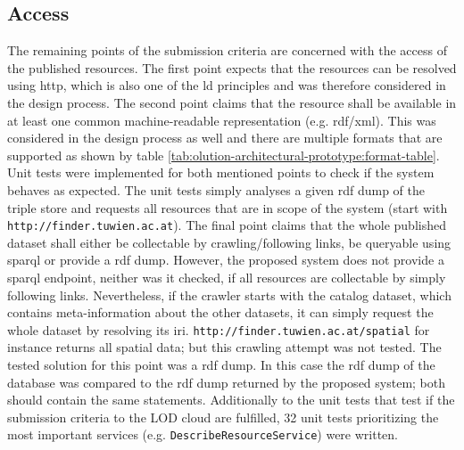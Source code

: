 \documentclass[draft,final]{vutinfth} %
\begin{document}
\subsection{Access}
\label{dicussion-chapter-evaluation:access}
The remaining points of the submission criteria are concerned with the access of the published resources. The first point expects that the resources can be resolved using \gls{http}, which is also one of the \gls{ld} principles and was therefore considered in the design process. The second point claims that the resource shall be available in at least one common machine-readable representation (e.g. \gls{rdf}/\gls{xml}). This was considered in the design process as well and there are multiple formats that are supported as shown by table \ref{tab:olution-architectural-prototype:format-table}. Unit 
tests were implemented for both mentioned points to check if the system behaves as expected. The unit tests simply analyses a given \gls{rdf} dump of the triple store and requests all resources that are in scope of the system (start with \texttt{http://finder.tuwien.ac.at}). The final point claims that the whole published dataset shall either be collectable by crawling/following links, be queryable using \gls{sparql} or provide a \gls{rdf} dump. However, the proposed system does not provide a \gls{sparql} endpoint, neither was it checked, if all resources are collectable by simply following links. Nevertheless, if the crawler starts with the catalog dataset, which contains meta-information about the other datasets, it can simply request the whole dataset by resolving its \gls{iri}. \texttt{http://finder.tuwien.ac.at/spatial} for instance returns all spatial data; but this crawling attempt was not tested. The tested solution for this point was  a \gls{rdf} dump. In this case the \gls{rdf} dump of the database was compared to the \gls{rdf} dump returned by the proposed system; both should contain the same statements. Additionally to the unit tests that test if the submission criteria to the LOD cloud are fulfilled, 32 unit tests prioritizing the most important services (e.g. \texttt{DescribeResourceService}) were written. 
\end{document}
